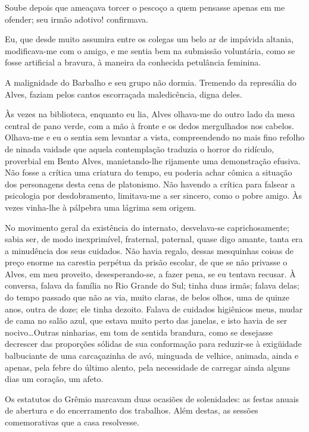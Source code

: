 Soube depois que ameaçava torcer o pescoço a
quem pensasse apenas em me ofender; seu irmão adotivo! confirmava. 

Eu, que desde muito assumira entre os colegas um belo ar de impávida
altania, modificava{}-me com o amigo, e me sentia bem na submissão
voluntária, como se fosse artificial a bravura, à maneira da conhecida
petulância feminina. 

A malignidade do Barbalho e seu grupo não dormia.
Tremendo da represália do Alves, faziam pelos cantos escorraçada
maledicência, digna deles. 


Às vezes na biblioteca, enquanto eu lia,
Alves olhava{}-me do outro lado da mesa central de pano verde, com a
mão à fronte e os dedos mergulhados nos cabelos. Olhava{}-me e eu o
sentia sem levantar a vista, compreendendo no mais fino refolho de
ninada vaidade que aquela contemplação traduzia o horror do ridículo,
proverbial em Bento Alves, manietando{}-lhe rijamente uma demonstração
efusiva. Não fosse a crítica uma criatura do tempo, eu poderia achar
cômica a situação dos personagens desta cena de platonismo. Não havendo
a crítica para falsear a psicologia por desdobramento, limitava{}-me a
ser sincero, como o pobre amigo. Às vezes vinha{}-lhe à pálpebra uma
lágrima sem origem. 

No movimento geral da existência do internato,
desvelava{}-se caprichosamente; sabia ser, de modo inexprimível,
fraternal, paternal, quase digo amante, tanta era a minudência dos seus
cuidados. Não havia regalo, dessas mesquinhas coisas de preço enorme na
carestia perpétua da prisão escolar, de que se não privasse o Alves, em
meu proveito, desesperando{}-se, a fazer pena, se eu tentava recusar. À
conversa, falava da família no Rio Grande do Sul; tinha duas irmãs;
falava delas; do tempo passado que não as via, muito claras, de belos olhos, 
uma de quinze anos, outra de doze; ele tinha dezoito. Falava de cuidados higiênicos
meus, mudar de cama no salão azul, que estava muito perto das janelas,
e isto havia de ser nocivo\ldots Outras ninharias, em tom de sentida
brandura, como se desejasse decrescer das proporções sólidas de sua
conformação para reduzir{}-se à exigüidade balbuciante de uma
carcaçazinha de avó, minguada de velhice, animada, ainda e apenas, pela
febre do último alento, pela necessidade de carregar ainda alguns dias
um coração, um afeto. 

Os estatutos do Grêmio marcavam duas ocasiões de
solenidades: as festas anuais de abertura e do encerramento dos
trabalhos. Além destas, as sessões comemorativas que a casa resolvesse.

